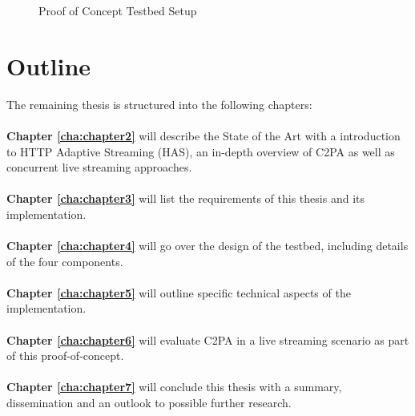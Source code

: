 \begin{figure}[H]
    \centering
    \caption{Proof of Concept Testbed Setup}
    \label{fig:testbed}
\end{figure}

\section{Outline\label{sec:outline}}

The remaining thesis is structured into the following chapters:
\\
\\
\textbf{Chapter \ref{cha:chapter2}} will describe the State of the Art with a introduction to HTTP Adaptive Streaming (HAS), an in-depth overview of C2PA as well as concurrent live streaming approaches.
\\
\\
\textbf{Chapter \ref{cha:chapter3}} will list the requirements of this thesis and its implementation.
\\
\\
\textbf{Chapter \ref{cha:chapter4}} will go over the design of the testbed, including details of the four components.
\\
\\
\textbf{Chapter \ref{cha:chapter5}} will outline specific technical aspects of the implementation.
\\
\\
\textbf{Chapter \ref{cha:chapter6}} will evaluate C2PA in a live streaming scenario as part of this proof-of-concept.
\\
\\
\textbf{Chapter \ref{cha:chapter7}} will conclude this thesis with a summary, dissemination and an outlook to possible further research.